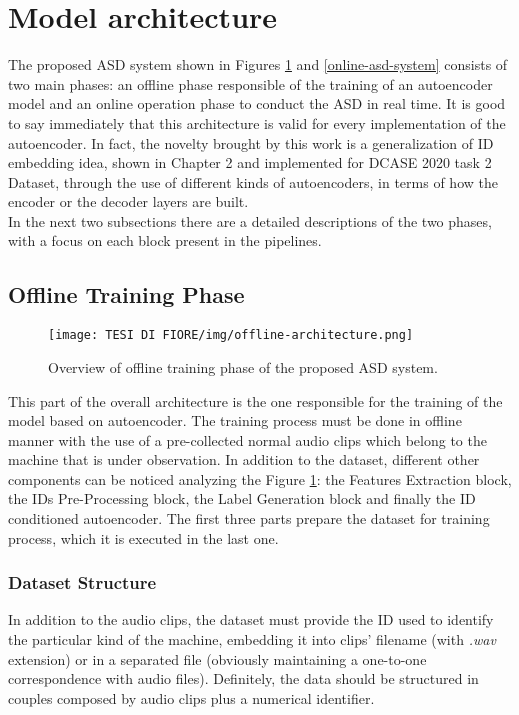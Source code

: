\section{Model architecture}
The proposed ASD system shown in Figures \ref{offline-asd-system} and \ref{online-asd-system} consists of two main phases: an offline phase responsible of the training of an autoencoder model and an online operation phase to conduct the ASD in real time. It is good to say immediately that this architecture is valid for every implementation of the autoencoder. In fact, the novelty brought by this work is a generalization of ID embedding idea, shown in Chapter 2 and implemented for DCASE 2020 task 2 Dataset, through the use of different kinds of autoencoders, in terms of how the encoder or the decoder layers are built.\\
In the next two subsections there are a detailed descriptions of the two phases, with a focus on each block present in the pipelines.

\subsection{Offline Training Phase}
\begin{figure}[ht]
\texttt{[image: TESI DI FIORE/img/offline-architecture.png]}
\centering
\caption{Overview of offline training phase of the proposed ASD system.}
\label{offline-asd-system}
\end{figure}
This part of the overall architecture is the one responsible for the training of the model based on autoencoder. The training process must be done in offline manner with the use of a pre-collected normal audio clips which belong to the machine that is under observation. In addition to the dataset, different other components can be noticed analyzing the Figure \ref{offline-asd-system}: the Features Extraction block, the IDs Pre-Processing block, the Label Generation block and finally the ID conditioned autoencoder. The first three parts prepare the dataset for training process, which it is executed in the last one.

\subsubsection{Dataset Structure}
In addition to the audio clips, the dataset must provide the ID used to identify the particular kind of the machine, embedding it into clips' filename (with \textit{.wav} extension) or in a separated file (obviously maintaining a one-to-one correspondence with audio files). Definitely, the data should be structured in couples composed by audio clips plus a numerical identifier.

